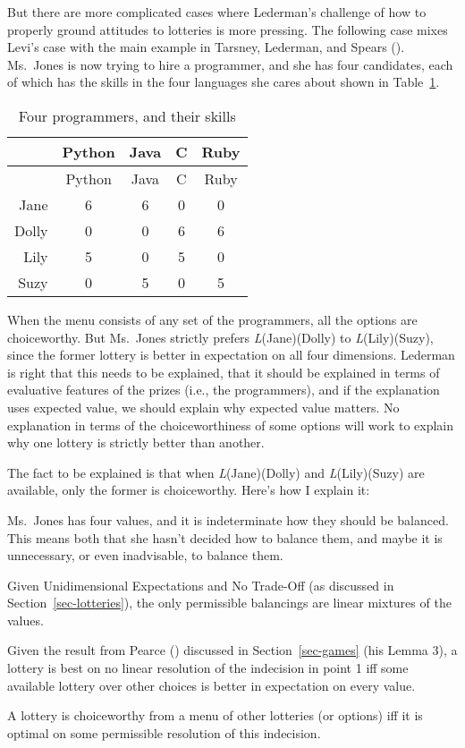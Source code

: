 \documentclass[
  10.5pt,
  twoside]{article}
\providecommand{\tightlist}{%
  \setlength{\itemsep}{0pt}\setlength{\parskip}{0pt}}
\let\oldenumerate\enumerate
\let\endoldenumerate\endenumerate
\renewenvironment{enumerate}
  {\vskip 5pt\oldenumerate}
  {\endoldenumerate\vskip 5pt}
\begin{document}
But there are more complicated cases where Lederman's challenge of how
to properly ground attitudes to lotteries is more pressing. The
following case mixes Levi's case with the main example in Tarsney,
Lederman, and Spears ().
Ms.~Jones is now trying to hire a programmer, and she has four
candidates, each of which has the skills in the four languages she cares
about shown in Table~\ref{tbl-programmers}.

\begin{longtable}[]{@{}rcccc@{}}
\caption{Four programmers, and their
skills}\label{tbl-programmers}\tabularnewline
\toprule\noalign{}
& Python & Java & C & Ruby \\
\midrule\noalign{}
\endfirsthead
\toprule\noalign{}
& Python & Java & C & Ruby \\
\midrule\noalign{}
\endhead
\bottomrule\noalign{}
\endlastfoot
Jane & 6 & 6 & 0 & 0 \\
Dolly & 0 & 0 & 6 & 6 \\
Lily & 5 & 0 & 5 & 0 \\
Suzy & 0 & 5 & 0 & 5 \\
\end{longtable}

When the menu consists of any set of the programmers, all the options
are choiceworthy. But Ms.~Jones strictly prefers \emph{L}(Jane)(Dolly)
to \emph{L}(Lily)(Suzy), since the former lottery is better in
expectation on all four dimensions. Lederman is right that this needs to
be explained, that it should be explained in terms of evaluative
features of the prizes (i.e., the programmers), and if the explanation
uses expected value, we should explain why expected value matters. No
explanation in terms of the choiceworthiness of some options will work
to explain why one lottery is strictly better than another.

The fact to be explained is that when \emph{L}(Jane)(Dolly) and
\emph{L}(Lily)(Suzy) are available, only the former is choiceworthy.
Here's how I explain it:

\begin{enumerate}
\def\labelenumi{\arabic{enumi}.}
\tightlist
\item
  Ms.~Jones has four values, and it is indeterminate how they should be
  balanced. This means both that she hasn't decided how to balance them,
  and maybe it is unnecessary, or even inadvisable, to balance them.
\item
  Given Unidimensional Expectations and No Trade-Off (as discussed in
  Section~\ref{sec-lotteries}), the only permissible balancings are
  linear mixtures of the values.
\item
  Given the result from Pearce ()
  discussed in Section~\ref{sec-games} (his Lemma 3), a lottery is best
  on no linear resolution of the indecision in point 1 iff some
  available lottery over other choices is better in expectation on every
  value.
\item
  A lottery is choiceworthy from a menu of other lotteries (or options)
  iff it is optimal on some permissible resolution of this indecision.
\end{enumerate}
\end{document}
